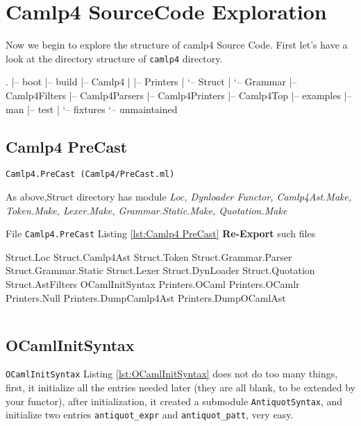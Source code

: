 \section{Camlp4 SourceCode Exploration}
Now we begin to explore the structure of camlp4 Source Code.  First
let's have a look at the directory structure of \verb|camlp4|
directory.


\begin{bashcode}
.
|-- boot
|-- build
|-- Camlp4
|   |-- Printers
|   `-- Struct      
|       `-- Grammar
|-- Camlp4Filters
|-- Camlp4Parsers
|-- Camlp4Printers
|-- Camlp4Top
|-- examples
|-- man
|-- test
|   `-- fixtures
`-- unmaintained   
\end{bashcode}


\subsection{Camlp4 PreCast}
\verb|Camlp4.PreCast (Camlp4/PreCast.ml)|

As above,Struct directory has module \textit{Loc, Dynloader Functor,
  Camlp4Ast.Make, Token.Make, Lexer.Make, Grammar.Static.Make,
  Quotation.Make}

File \verb|Camlp4.PreCast| Listing \ref{lst:Camlp4 PreCast}
\textbf{Re-Export} such files

\begin{bluetext}
  Struct.Loc Struct.Camlp4Ast Struct.Token Struct.Grammar.Parser
  Struct.Grammar.Static Struct.Lexer Struct.DynLoader Struct.Quotation
  Struct.AstFilters OCamlInitSyntax Printers.OCaml Printers.OCamlr
  Printers.Null Printers.DumpCamlp4Ast Printers.DumpOCamlAst
\end{bluetext}


\inputminted[fontsize=\scriptsize, 
lastline=55]{ocaml}{code/camlp4/source/precast.ml}



\subsection{OCamlInitSyntax}

\verb|OCamlInitSyntax| Listing \ref{lst:OCamlInitSyntax} does not do
too many things, first, it initialize all the entries needed later
(they are all blank, to be extended by your functor), after
initialization, it created a submodule \verb|AntiquotSyntax|, and
initialize two entries \verb|antiquot_expr| and \verb|antiquot_patt|,
very easy.

